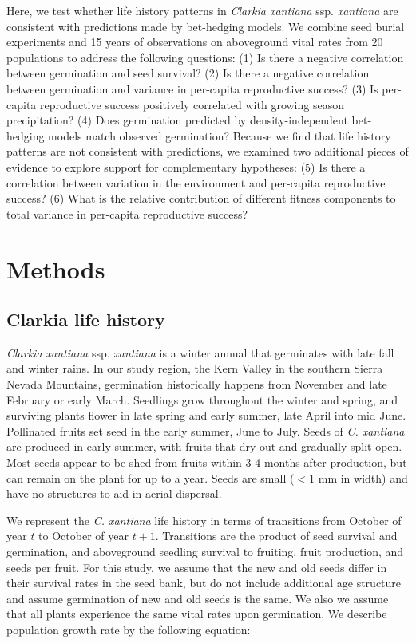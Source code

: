\documentclass[12pt, oneside, titlepage]{article}   	%
\begin{document}
Here, we test whether life history patterns in \textit{Clarkia xantiana} ssp. \textit{xantiana} are consistent with predictions made by bet-hedging models. We combine seed burial experiments and 15 years of observations on aboveground vital rates from 20 populations to address the following questions: (1) Is there a negative correlation between germination and seed survival? (2) Is there a negative correlation between germination and variance in per-capita reproductive success? (3) Is per-capita reproductive success positively correlated with growing season precipitation? (4) Does germination predicted by density-independent bet-hedging models match observed germination? Because we find that life history patterns are not consistent with predictions, we examined two additional pieces of evidence to explore support for complementary hypotheses: (5) Is there a correlation between variation in the environment and per-capita reproductive success? (6) What is the relative contribution of different fitness components to total variance in per-capita reproductive success?

\section{Methods}

\subsection{Clarkia life history}

\textit{Clarkia xantiana} ssp. \textit{xantiana} is a winter annual that germinates with late fall and winter rains. In our study region, the Kern Valley in the southern Sierra Nevada Mountains, germination historically happens from November and late February or early March. Seedlings grow throughout the winter and spring, and surviving plants flower in late spring and early summer, late April into mid June. Pollinated fruits set seed in the early summer, June to July. Seeds of \textit{C. xantiana} are produced in early summer, with fruits that dry out and gradually split open. Most seeds appear to be shed from fruits within 3-4 months after production, but can remain on the plant for up to a year. Seeds are small ($<1$ mm in width) and have no structures to aid in aerial dispersal. 

We represent the \textit{C. xantiana} life history in terms of transitions from October of year $t$ to October of year $t+1$. Transitions are the product of seed survival and germination, and aboveground seedling survival to fruiting, fruit production, and seeds per fruit. For this study, we assume that the new and old seeds differ in their survival rates in the seed bank, but do not include additional age structure and assume germination of new and old seeds is the same. We also we assume that all plants experience the same vital rates upon germination. We describe population growth rate by the following equation:
\end{document}
